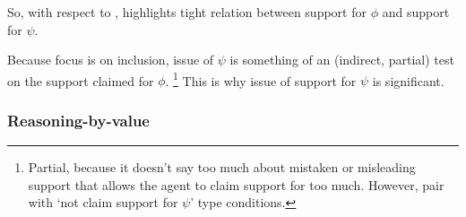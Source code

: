 \begin{note}
  So, with respect to \nI{}, \incl{} highlights tight relation between support for \(\phi\) and support for \(\psi\).

  Because focus is on inclusion, issue of \(\psi\) is something of an (indirect, partial) test on the support claimed for \(\phi\).\nolinebreak
  \footnote{
    Partial, because it doesn't say too much about mistaken or misleading support that allows the agent to claim support for too much.
    However, pair with `not claim support for \(\psi\)' type conditions.
  }
  This is why issue of support for \(\psi\) is significant.
\end{note}

\subsubsection{Reasoning-by-value}
\label{sec:reasoning-value}

